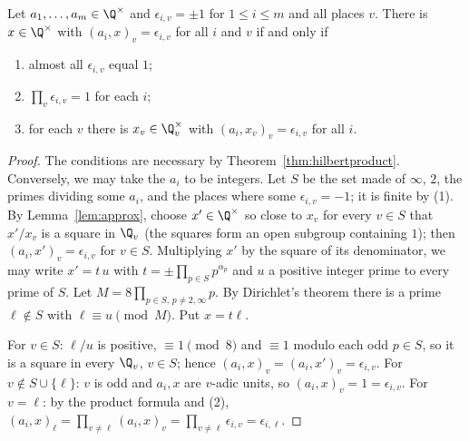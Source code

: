 \begin{theorem}\label{thm:existence}
Let $a_1,\dots,a_m\in\Q^\times$ and $\epsilon_{i,v}=\pm1$ for $1\le i\le m$ and all places $v$. There is $x\in\Q^\times$ with
$(a_i,x)_v=\epsilon_{i,v}$ for all $i$ and $v$ if and only if
\begin{enumerate}[label=(\arabic*)]
\item almost all $\epsilon_{i,v}$ equal $1$;
\item $\prod_v\epsilon_{i,v}=1$ for each $i$;
\item for each $v$ there is $x_v\in\Q_v^\times$ with $(a_i,x_v)_v=\epsilon_{i,v}$ for all $i$.
\end{enumerate}
\end{theorem}
\begin{proof}
The conditions are necessary by Theorem~\ref{thm:hilbertproduct}. Conversely, we may take the $a_i$ to be integers. Let $S$ be
the set made of $\infty$, $2$, the primes dividing some $a_i$, and the places where some $\epsilon_{i,v}=-1$; it is finite by
(1). By Lemma~\ref{lem:approx}, choose $x'\in\Q^\times$ so close to $x_v$ for every $v\in S$ that $x'/x_v$ is a square in $\Q_v$ (the
squares form an open subgroup containing $1$); then $(a_i,x')_v=\epsilon_{i,v}$ for $v\in S$. Multiplying $x'$ by the square of
its denominator, we may write $x'=t\,u$ with $t=\pm\prod_{p\in S}p^{\alpha_p}$ and $u$ a positive integer prime to every prime of
$S$. Let $M=8\prod_{p\in S,\,p\ne2,\infty}p$. By Dirichlet's theorem there is a prime $\ell\notin S$ with $\ell\equiv u\pmod M$.
Put $x=t\ell$.

For $v\in S$: $\ell/u$ is positive, $\equiv1\pmod8$ and $\equiv1$ modulo each odd $p\in S$, so it is a square in every $\Q_v$,
$v\in S$; hence $(a_i,x)_v=(a_i,x')_v=\epsilon_{i,v}$. For $v\notin S\cup\{\ell\}$: $v$ is odd and $a_i,x$ are $v$-adic units, so
$(a_i,x)_v=1=\epsilon_{i,v}$. For $v=\ell$: by the product formula and (2),
$(a_i,x)_\ell=\prod_{v\ne\ell}(a_i,x)_v=\prod_{v\ne\ell}\epsilon_{i,v}=\epsilon_{i,\ell}$.
\end{proof}

